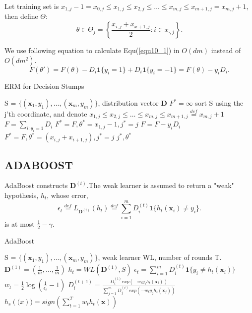 Let training set is $x_{1,j} - 1 = x_{0,j} \le x_{1,j} \le x_{2,j} \le \dots \le x_{m,j} \le x_{m+1, j} = x_{m,j} + 1$,
then define $\Theta$: 
\[
	\theta \in 
	\Theta_j = \left\{
		\frac{x_{i,j}+x_{x+1,j}}{2} : i \in x_{\cdot, j}
	\right\}
.\]

We use following equation to calculate Equ(\ref{equ10_1}) in $O(dm)$ instead of $O(dm^2)$.
\[
	F(\theta') = F(\theta) - D_i \mathbf{1} \{ y_i=1 \} + D_i \mathbf{1} \{ y_i = -1 \} 
	= F(\theta) - y_i D_i
.\]

\begin{algorithm}[h!]
	\caption{ERM for Decision Stumps}	
	\begin{algorithmic}
		\Require S = $\{ (\mathbf{x}_1, y_1), \dots, (\mathbf{x}_m, y_m) \}$,
		distribution vector $\mathbf{D}$
		\Ensure $F^* = \infty$ 
			\State sort S using the j'th coordinate, and denote
			\State $x_{1,j} \le x_{2,j} \le \dots \le x_{m,j} \le x_{m+1,j}
			\overset{def}{=} x_{m,j} + 1$
			\State $F = \sum_{i:y_i=1}D_i$
				\State $F^* = F, \theta^* = x_{1,j}-1,j^*=j$
			\EndIf
				\State $F = F - y_i D_i$
				\State  $F^*=F, \theta^* = (x_{i,j}+x_{i+1,j}), j^* = j$	
				\EndIf
			\EndFor
		\EndFor
		\State\Return $j^*, \theta^*$
	\end{algorithmic}
\end{algorithm}

\subsection{ADABOOST}

AdaBoost constructs $\mathbf{D}^{(t)}$.The weak learner is assumed to return a "weak"
hypothesis, $h_t$, whose error,
\[
	\epsilon_t \overset{def}{=} L_{\mathbf{D}^{(t)}}(h_t) \overset{def}{=}
	\sum\limits^m_{i=1} D^{(t)}_i \mathbf{1} \{ h_t(\mathbf{x}_i) \ne y_i \}
.\]
is at most $\frac{1}{2}-\gamma$.

\begin{algorithm}[h!]
	\caption{AdaBoost}
	\begin{algorithmic}
		\Require S = $\{ (\mathbf{x}_1, y_1), \dots, (\mathbf{x}_m, y_m) \}$,
			weak learner WL, number of rounds T.
		\Ensure $\mathbf{D}^{(1)} = (\frac{1}{m},\dots,\frac{1}{m})$
		\For{$t = 1, \dots, T$ }
			\State $h_t = WL(\mathbf{D}^{(1)},S)$
			\State $\epsilon_t = \sum^m_{i=1} D^{(t)}_i \mathbf{1} \{ y_i \ne h_t( \mathbf{x}_i) \}$
			\State $w_t = \frac{1}{2} \log (\frac{1}{\epsilon_t}-1)$
			\For{$i = 1, \dots, T$ }
			\State $D^{(t+1)}_i = 
			\frac{D^{(t)}_i exp(-w_t y_i h_t(\mathbf{x}_i))}
			{\sum^m_{j=1} D^{(t)}_j exp(-w_t y_j h_t(\mathbf{x}_j))}$	
			\EndFor
		\EndFor
		\State \Return $h_s(\mathbf(x)) = sign \left( \sum^T_{t=1} w_t h_t(\mathbf{x}) \right)$
	\end{algorithmic}
\end{algorithm}

